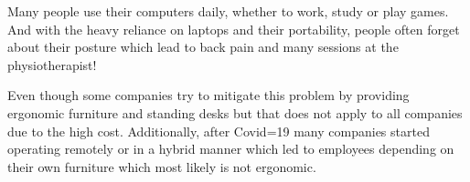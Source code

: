 Many people use their computers daily, whether to work, study or play games.
And with the heavy reliance on laptops and their portability, people often forget about
their posture which lead to back pain and many sessions at the physiotherapist!

\p
Even though some companies try to mitigate this problem by providing ergonomic furniture
and standing desks but that does not apply to all companies due to the high cost. 
Additionally, after Covid=19 many companies started operating remotely or in a hybrid manner 
which led to employees depending on their own furniture which most likely is not ergonomic.